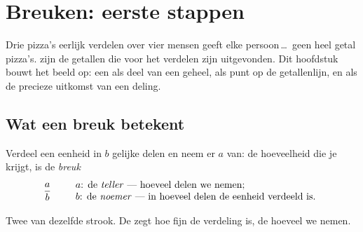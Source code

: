 \chapter{Breuken: eerste stappen}\label{ch:g6:fractions}

Drie pizza's eerlijk verdelen over vier mensen geeft elke persoon\,\dots\ geen
heel getal pizza's.  zijn de getallen die voor het verdelen zijn
uitgevonden. Dit hoofdstuk bouwt het beeld op: een  als deel van een
geheel, als punt op de getallenlijn, en als de precieze uitkomst van een
deling.

\section{Wat een breuk betekent}

\begin{definition}[Breuk]\label{def:g6:fractions:def}
Verdeel een eenheid in $b$ gelijke delen en neem er $a$ van: de hoeveelheid
die je krijgt, is de \emph{breuk}
\[
\frac{a}{b}
\qquad
\begin{array}{l}
a \text{: de \emph{teller} --- hoeveel delen we nemen;}\\
b \text{: de \emph{noemer} --- in hoeveel delen de eenheid verdeeld is.}
\end{array}
\]
\end{definition}

\begin{omfigure}

{\small Twee  van dezelfde strook. De  zegt hoe fijn de verdeling
is, de  hoeveel we nemen.}
\end{omfigure}

